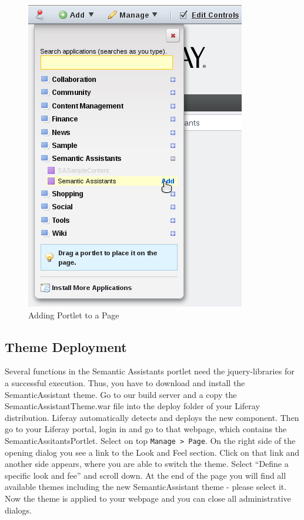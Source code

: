 \begin{figure}
\centering
\includegraphics[scale=0.6]{pictures/liferay_add_portlet.png}
\caption{Adding \sa Portlet to a Page}
\label{fig:liferay_add_portlet}
\end{figure}

\subsection{Theme Deployment}
\label{sec:theme_deploy}
Several functions in the Semantic Assistants portlet need the jquery-libraries for a successful execution. Thus, you have to download and install the SemanticAssistant theme. Go to our build server and a copy the SemanticAssistantTheme.war file into the deploy folder of your Liferay distribution. Liferay automatically detects and deploys the new component. Then go to your Liferay portal, login in and go to that webpage, which contains the SemanticAssitantsPortlet. Select on top \texttt{Manage \textgreater~Page}. On the right side of the opening dialog you see a link to the Look and Feel section. Click on that link and another side appears, where you are able to switch the theme. Select ``Define a specific look and fee'' and scroll down. At the end of the page you will find all available themes including the new SemanticAssistant theme - please select it. Now the theme is applied to your webpage and you can close all administrative dialogs.

